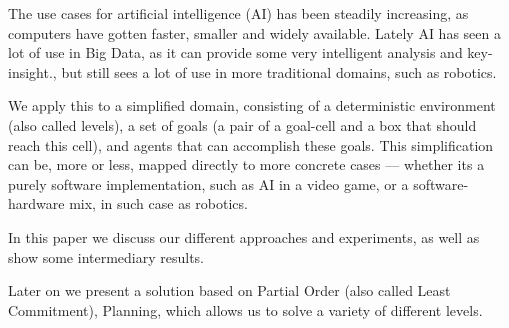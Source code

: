 \documentclass[Main]{subfiles}
\begin{document}
The use cases for artificial intelligence (AI) has been steadily increasing, as computers have gotten faster, smaller and widely available.
Lately AI has seen a lot of use in Big Data, as it can provide some very intelligent analysis and key-insight.\cite{OLeary2013},
but still sees a lot of use in more traditional domains, such as robotics.

We apply this to a simplified domain, consisting of a deterministic environment (also called levels), a set of goals (a pair of a goal-cell and a box that should reach this cell), and agents that can accomplish these goals.
This simplification can be, more or less, mapped directly to more concrete cases --- 
whether its a purely software implementation, such as AI in a video game, or a software-hardware mix, in such case as robotics.

In this paper we discuss our different approaches and experiments, as well as show some intermediary results.

Later on we present a solution based on Partial Order (also called Least Commitment), Planning, 
which allows us to solve a variety of different levels. 
\end{document}
